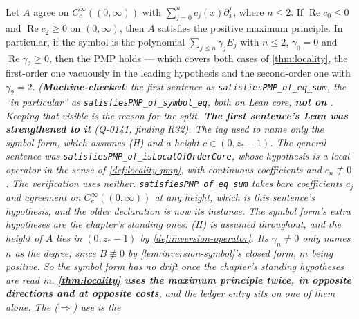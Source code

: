 \begin{lemma}
\label{lem:pmp-verification}
\leanok
Let $A$ agree on $C_c^\infty((0,\infty))$ with $\sum_{j=0}^{n} c_j(x)\partial_x^j$, where
$n \le 2$. If $\operatorname{Re} c_0 \le 0$ and $\operatorname{Re} c_2 \ge 0$ on $(0,\infty)$,
then $A$ satisfies the positive maximum principle. In particular, if the symbol is the polynomial
$\sum_{j\le n}\gamma_j E_j$ with $n \le 2$, $\gamma_0 = 0$ and $\operatorname{Re}\gamma_2 \ge 0$,
then the PMP holds --- which covers both cases of \ref{thm:locality}, the first-order one
vacuously in the leading hypothesis and the second-order one with $\gamma_2 = 2$.
\statusT\quad\emph{(\textbf{Machine-checked}: the first sentence as \texttt{satisfiesPMP\_of\_eq\_sum},
the ``in particular'' as \texttt{satisfiesPMP\_of\_symbol\_eq}, both on Lean core,
\textbf{not on }. Keeping that visible is the reason for the split.
\textbf{The first sentence's Lean was strengthened to it} (Q-0141, finding R32). The tag used to
name only the symbol form, which assumes (H) and a height $c \in (0, z_*-1)$. The general
sentence was \texttt{satisfiesPMP\_of\_isLocalOfOrderCore}, whose hypothesis is a
local operator in the sense of \ref{def:locality-pmp}, with continuous coefficients and
$c_n \not\equiv 0$. The verification uses neither. \texttt{satisfiesPMP\_of\_eq\_sum} takes bare
coefficients $c_j$ and agreement on $C_c^\infty((0,\infty))$ at any height, which is this
sentence's hypothesis, and the older declaration is now its instance. The symbol form's extra
hypotheses are the chapter's standing ones. (H) is assumed throughout, and the height of $A$ lies
in $(0, z_*-1)$ by \ref{def:inversion-operator}. Its $\gamma_n \ne 0$ only names $n$ as the degree,
since $B \not\equiv 0$ by \ref{lem:inversion-symbol}'s closed form, $m$ being positive. So the
symbol form has no drift once the chapter's standing hypotheses are read in.
\textbf{\ref{thm:locality} uses the maximum principle twice, in opposite directions and at
opposite costs}, and the ledger entry sits on one of them alone. The ($\Rightarrow$) use is the
}
\end{lemma}
